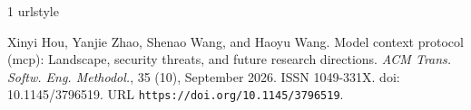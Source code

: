 \begin{thebibliography}{1}
\providecommand{\natexlab}[1]{#1}
\providecommand{\url}[1]{\texttt{#1}}
\expandafter\ifx\csname urlstyle\endcsname\relax
  \providecommand{\doi}[1]{doi: #1}\else
  \providecommand{\doi}{doi: \begingroup \urlstyle{rm}\Url}\fi

Xinyi Hou, Yanjie Zhao, Shenao Wang, and Haoyu Wang.
\newblock Model context protocol (mcp): Landscape, security threats, and future research directions.
\newblock \emph{ACM Trans. Softw. Eng. Methodol.}, 35 (10), September 2026.
\newblock ISSN 1049-331X.
\newblock \doi{10.1145/3796519}.
\newblock URL \url{https://doi.org/10.1145/3796519}.

\end{thebibliography}
